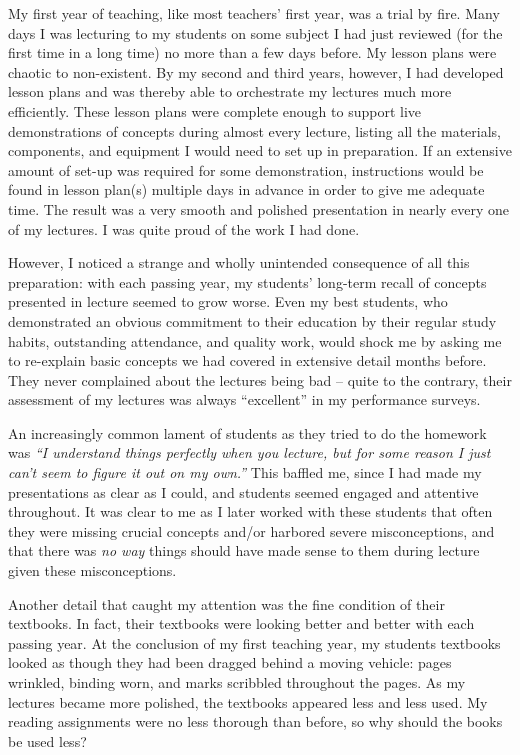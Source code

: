 My first year of teaching, like most teachers' first year, was a trial by fire.  Many days I was lecturing to my students on some subject I had just reviewed (for the first time in a long time) no more than a few days before.  My lesson plans were chaotic to non-existent.  By my second and third years, however, I had developed lesson plans and was thereby able to orchestrate my lectures much more efficiently.  These lesson plans were complete enough to support live demonstrations of concepts during almost every lecture, listing all the materials, components, and equipment I would need to set up in preparation.  If an extensive amount of set-up was required for some demonstration, instructions would be found in lesson plan(s) multiple days in advance in order to give me adequate time.  The result was a very smooth and polished presentation in nearly every one of my lectures.  I was quite proud of the work I had done.

However, I noticed a strange and wholly unintended consequence of all this preparation: with each passing year, my students' long-term recall of concepts presented in lecture seemed to grow worse.  Even my best students, who demonstrated an obvious commitment to their education by their regular study habits, outstanding attendance, and quality work, would shock me by asking me to re-explain basic concepts we had covered in extensive detail months before.  They never complained about the lectures being bad -- quite to the contrary, their assessment of my lectures was always ``excellent'' in my performance surveys.

An increasingly common lament of students as they tried to do the homework was \textit{``I understand things perfectly when you lecture, but for some reason I just can't seem to figure it out on my own.''}  This baffled me, since I had made my presentations as clear as I could, and students seemed engaged and attentive throughout.  It was clear to me as I later worked with these students that often they were missing crucial concepts and/or harbored severe misconceptions, and that there was \textit{no way} things should have made sense to them during lecture given these misconceptions.

Another detail that caught my attention was the fine condition of their textbooks.  In fact, their textbooks were looking better and better with each passing year.  At the conclusion of my first teaching year, my students textbooks looked as though they had been dragged behind a moving vehicle: pages wrinkled, binding worn, and marks scribbled throughout the pages.  As my lectures became more polished, the textbooks appeared less and less used.  My reading assignments were no less thorough than before, so why should the books be used less?

